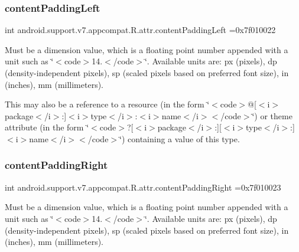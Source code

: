 \subsubsection{\texorpdfstring{content\+Padding\+Left}{contentPaddingLeft}}
{\footnotesize\ttfamily int android.\+support.\+v7.\+appcompat.\+R.\+attr.\+content\+Padding\+Left =0x7f010022\hspace{0.3cm}{\ttfamily [static]}}

Must be a dimension value, which is a floating point number appended with a unit such as \char`\"{}$<$code$>$14.\+5sp$<$/code$>$\char`\"{}. Available units are\+: px (pixels), dp (density-\/independent pixels), sp (scaled pixels based on preferred font size), in (inches), mm (millimeters). 

This may also be a reference to a resource (in the form \char`\"{}$<$code$>$@\mbox{[}$<$i$>$package$<$/i$>$\+:\mbox{]}$<$i$>$type$<$/i$>$\+:$<$i$>$name$<$/i$>$$<$/code$>$\char`\"{}) or theme attribute (in the form \char`\"{}$<$code$>$?\mbox{[}$<$i$>$package$<$/i$>$\+:\mbox{]}\mbox{[}$<$i$>$type$<$/i$>$\+:\mbox{]}$<$i$>$name$<$/i$>$$<$/code$>$\char`\"{}) containing a value of this type. \mbox{\label{classandroid_1_1support_1_1v7_1_1appcompat_1_1R_1_1attr_a28810441733d8d355aaacfc0a5513bf8}} 
\subsubsection{\texorpdfstring{content\+Padding\+Right}{contentPaddingRight}}
{\footnotesize\ttfamily int android.\+support.\+v7.\+appcompat.\+R.\+attr.\+content\+Padding\+Right =0x7f010023\hspace{0.3cm}{\ttfamily [static]}}

Must be a dimension value, which is a floating point number appended with a unit such as \char`\"{}$<$code$>$14.\+5sp$<$/code$>$\char`\"{}. Available units are\+: px (pixels), dp (density-\/independent pixels), sp (scaled pixels based on preferred font size), in (inches), mm (millimeters). 

